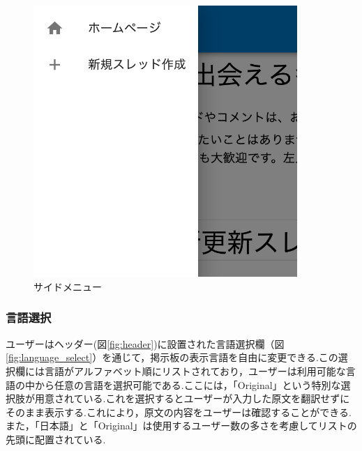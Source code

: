 \documentclass[b5paper,12pt,dvipdfmx]{jsreport}
\begin{document}
\begin{figure}[H]
	\centering
    \includegraphics[width=100mm,height=103.02mm]{./img/feature/side_menu.png}
	\caption{サイドメニュー}
	\label{fig:side_menu}
\end{figure}


\subsubsection{言語選択}
ユーザーはヘッダー(図\ref{fig:header})に設置された言語選択欄（図\ref{fig:language_select}）を通じて，掲示板の表示言語を自由に変更できる.この選択欄には言語がアルファベット順にリストされており，ユーザーは利用可能な言語の中から任意の言語を選択可能である.ここには，「Original」という特別な選択肢が用意されている.これを選択するとユーザーが入力した原文を翻訳せずにそのまま表示する.これにより，原文の内容をユーザーは確認することができる.また，「日本語」と「Original」は使用するユーザー数の多さを考慮してリストの先頭に配置されている.

\end{document}
